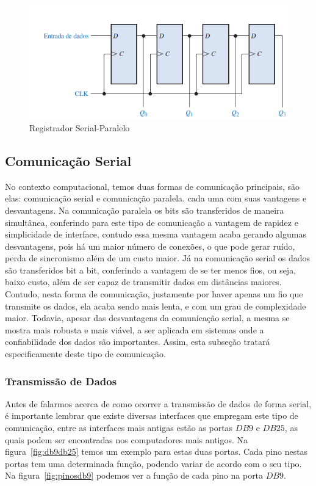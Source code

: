\documentclass[12pt]{article}
\begin{document}
\begin{figure}[!htbp]
\centering
\includegraphics[width=.5\textwidth]{img/p4/Fig7RegistradorSerialParalelo.png}
\caption{Registrador Serial-Paralelo}
\label{fig:registradorsp}
\end{figure}

\subsection{Comunicação Serial}
No contexto computacional, temos duas formas de comunicação principais, são elas: comunicação serial e comunicação paralela. cada uma com suas vantagens e desvantagens. Na comunicação paralela os bits são transferidos de maneira simultânea, conferindo para este tipo de comunicação a vantagem de rapidez e simplicidade de interface, contudo essa mesma vantagem acaba gerando algumas desvantagens, pois há um maior número de conexões, o que pode gerar ruído, perda de sincronismo além de um custo maior. Já na comunicação serial os dados são transferidos  bit a bit, conferindo a vantagem de se ter menos fios, ou seja, baixo custo, além de ser capaz de transmitir dados em distâncias maiores. Contudo, nesta forma de comunicação, justamente por haver apenas um fio que transmite os dados, ela acaba sendo mais lenta, e com um grau de complexidade maior. Todavia, apesar das desvantagens da comunicação serial, a mesma se mostra mais robusta e mais viável, a ser aplicada em sistemas onde a confiabilidade dos dados são importantes. Assim, esta subseção tratará especificamente deste tipo de comunicação. 

\subsubsection{Transmissão de Dados}
Antes de falarmos acerca de como ocorrer a transmissão de dados de forma serial, é importante lembrar que existe diversas interfaces que empregam este tipo de comunicação, entre as interfaces mais antigas estão as portas $DB9$ e $DB25$, as quais podem ser encontradas nos computadores mais antigos. Na figura~\ref{fig:db9db25} temos um exemplo para estas duas portas. Cada pino nestas portas tem uma determinada função, podendo variar de acordo com o seu tipo. Na  figura~\ref{fig:pinosdb9} podemos ver a função de cada pino na porta $DB9$.
\end{document}
